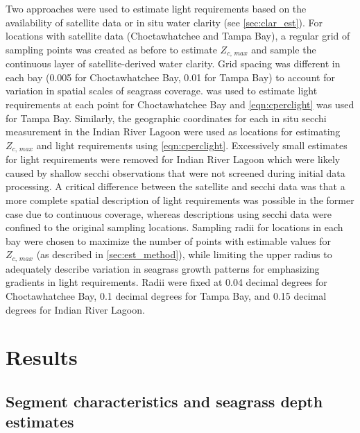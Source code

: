 \documentclass[letterpaper,12pt,oneside]{article}\usepackage[]{graphicx}\usepackage[]{color}
\begin{document}
Two approaches were used to estimate light requirements based on the availability of satellite data or in situ water clarity (see \cref{sec:clar_est}).  For locations with satellite data (Choctawhatchee and Tampa Bay), a regular grid of sampling points was created as before to estimate $Z_{c,\,max}$ and sample the continuous layer of satellite-derived water clarity.  Grid spacing was different in each bay (0.005 for Choctawhatchee Bay, 0.01 for Tampa Bay) to account for variation in spatial scales of seagrass coverage.   was used to estimate light requirements at each point for Choctawhatchee Bay and \cref{eqn:cperclight} was used for Tampa Bay.  Similarly, the geographic coordinates for each in situ secchi measurement in the Indian River Lagoon were used as locations for estimating $Z_{c,\,max}$ and light requirements using \cref{eqn:cperclight}.  Excessively small estimates for light requirements were removed for Indian River Lagoon which were likely caused by shallow secchi observations that were not screened during initial data processing.  A critical difference between the satellite and secchi data was that a more complete spatial description of light requirements was possible in the former case due to continuous coverage, whereas descriptions using secchi data were confined to the original sampling locations.  Sampling radii for locations in each bay were chosen to maximize the number of points with estimable values for $Z_{c,\,max}$ (as described in \cref{sec:est_method}), while limiting the upper radius to adequately describe variation in seagrass growth patterns for emphasizing gradients in light requirements. Radii were fixed at 0.04 decimal degrees for Choctawhatchee Bay, 0.1 decimal degrees for Tampa Bay, and 0.15 decimal degrees for Indian River Lagoon.

\section{Results}

\subsection{Segment characteristics and seagrass depth estimates}

\end{document}

